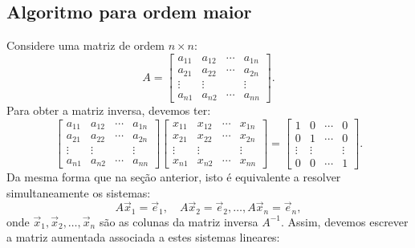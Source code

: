 \documentclass[../livro.tex]{subfiles}  %
\begin{document}
\subsection{Algoritmo para ordem maior}\label{scn:alg-ordem-maior}

Considere uma matriz de ordem $n \times n$:
\begin{equation}
A =
\left[
\begin{array}{cccc}
a_{11} & a_{12} & \cdots & a_{1n} \\
a_{21} & a_{22} & \cdots & a_{2n} \\
\vdots & \vdots &        & \vdots \\
a_{n1} & a_{n2} & \cdots & a_{nn} 
\end{array}
\right].
\end{equation} Para obter a matriz inversa, devemos ter:
\begin{equation}
\left[
\begin{array}{cccc}
a_{11} & a_{12} & \cdots & a_{1n} \\
a_{21} & a_{22} & \cdots & a_{2n} \\
\vdots & \vdots &        & \vdots \\
a_{n1} & a_{n2} & \cdots & a_{nn} 
\end{array}
\right]
\left[
\begin{array}{cccc}
x_{11} & x_{12} & \cdots & x_{1n} \\
x_{21} & x_{22} & \cdots & x_{2n} \\
\vdots & \vdots &        & \vdots \\
x_{n1} & x_{n2} & \cdots & x_{nn} 
\end{array}
\right]
=
\left[
\begin{array}{cccc}
1   &    0   & \cdots &    0   \\
0   &    1   & \cdots &    0   \\
\vdots & \vdots &        & \vdots \\
0   &    0   & \cdots &    1   
\end{array}
\right].
\end{equation} Da mesma forma que na seção anterior, isto é equivalente a resolver simultaneamente os sistemas:
\begin{equation}
A \vec{x}_1 = \vec{e}_1, \quad A \vec{x}_2 = \vec{e}_2, \dots, A \vec{x}_n = \vec{e}_n,
\end{equation} onde $\vec{x}_1, \vec{x}_2, \dots, \vec{x}_n$ são as colunas da matriz inversa $A^{-1}$. Assim, devemos escrever a matriz aumentada associada a estes sistemas lineares:
\end{document}
